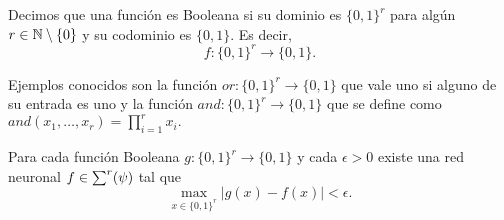 \begin{definicion}
    Decimos que una función es Booleana si su dominio es 
    $\{0,1\}^r$  para algún $r \in \mathbb{N} \setminus \{0\}$
    y su codominio es $\{0,1\}$. Es decir,
    \begin{equation}
      f:\{0,1\}^r \longrightarrow \{0,1\}.
    \end{equation}
\end{definicion}

Ejemplos conocidos son la función 
$or: \{0,1\}^r \longrightarrow \{0,1\}$  que vale 
uno si alguno de su entrada es uno y la función 
$and: \{0,1\}^r \longrightarrow \{0,1\}$
que se define como $and(x_1, \ldots, x_r) = \prod_{i=1}^r x_i.$

\begin{corolario}\label{corolario:2_5_función_Booleana} 
    Para cada función Booleana 
    $g: \{0,1\}^r \longrightarrow \{0,1\}$
     y 
    cada $\epsilon >0$ existe una red neuronal
    $f \in \sum^r (\psi)$ tal que 
    \begin{equation}
        \max_{x \in \{ 0,1\}^r} |g(x) - f(x)|
        < \epsilon.
    \end{equation}
\end{corolario}
